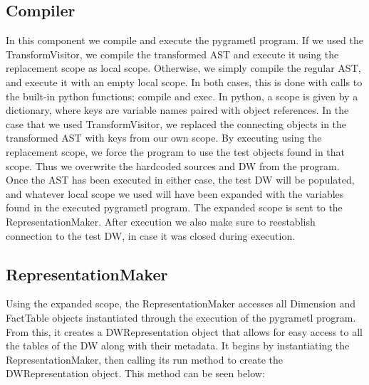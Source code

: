 \subsection{Compiler}
In this component we compile and execute the pygrametl program. If we used the TransformVisitor, we compile the transformed AST and execute it using the replacement scope as local scope. Otherwise, we simply compile the regular AST, and execute it with an empty local scope. In both cases, this is done with calls to the built-in python functions; compile and exec. In python, a scope is given by a dictionary, where keys are variable names paired with object references. In the case that we used TransformVisitor, we replaced the connecting objects in the transformed AST with keys from our own scope. By executing using the replacement scope, we force the program to use the test objects found in that scope. Thus we overwrite the hardcoded sources and DW from the program. Once the AST has been executed in either case, the test DW will be populated, and whatever local scope we used will have been expanded with the variables found in the executed pygrametl program. The expanded scope is sent to the RepresentationMaker. After execution we also make sure to reestablish connection to the test DW, in case it was closed during execution.

\subsection{RepresentationMaker}\label{ssec:Representation}
Using the expanded scope, the RepresentationMaker accesses all Dimension and FactTable objects instantiated through the execution of the pygrametl program. From this, it creates a DWRepresentation object that allows for easy access to all the tables of the DW along with their metadata. It begins by instantiating the RepresentationMaker, then calling its run method to create the DWRepresentation object. This method can be seen below:



